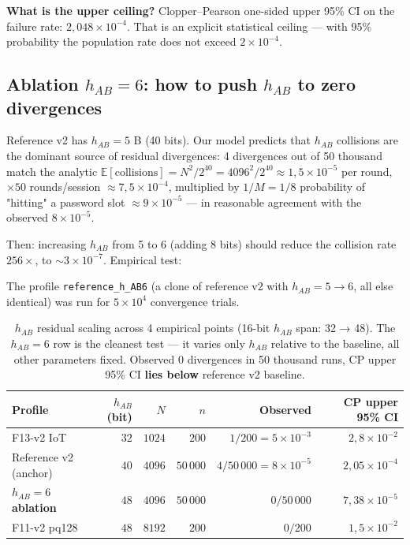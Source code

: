 \documentclass[11pt,a4paper]{article}
\begin{document}
\textbf{What is the upper ceiling?} Clopper--Pearson one-sided upper 95\% CI on the failure rate: $2{,}048 \times 10^{-4}$. That is an explicit statistical ceiling --- with 95\% probability the population rate does not exceed $2 \times 10^{-4}$.

\subsection{Ablation $h_{AB} = 6$: how to push $h_{AB}$ to zero divergences}\label{pop:exp-habresidual}

Reference v2 has $h_{AB} = 5$ B (40 bits). Our model predicts that $h_{AB}$ collisions are the dominant source of residual divergences: 4 divergences out of 50 thousand match the analytic $\mathbb{E}[\text{collisions}] = N^2 / 2^{40} = 4096^2 / 2^{40} \approx 1{,}5 \times 10^{-5}$ per round, $\times 50$ rounds/session $\approx 7{,}5 \times 10^{-4}$, multiplied by $1/M=1/8$ probability of "hitting" a password slot $\approx 9 \times 10^{-5}$ --- in reasonable agreement with the observed $8 \times 10^{-5}$.

Then: increasing $h_{AB}$ from 5 to 6 (adding 8 bits) should reduce the collision rate $256\times$, to $\sim 3 \times 10^{-7}$. Empirical test:

The profile \texttt{reference\_h\_AB6} (a clone of reference v2 with $h_{AB} = 5 \to 6$, all else identical) was run for $5 \times 10^4$ convergence trials.

\begin{table}[ht]
\centering
\small
\begin{tabular}{lrrrrr}
\toprule
\textbf{Profile} & \textbf{$h_{AB}$ (bit)} & \textbf{$N$} & \textbf{$n$} & \textbf{Observed} & \textbf{CP upper 95\% CI} \\
\midrule
F13-v2 IoT             & $32$ & $1024$ & $200$ & $1/200 = 5 \times 10^{-3}$ & $2{,}8 \times 10^{-2}$ \\
Reference v2 (anchor) & $40$ & $4096$ & $50\,000$ & $4/50\,000 = 8 \times 10^{-5}$ & $2{,}05 \times 10^{-4}$ \\
\textbf{$h_{AB}=6$ ablation} & \textbf{$48$} & \textbf{$4096$} & \textbf{$50\,000$} & \textbf{$0/50\,000$} & \textbf{$7{,}38 \times 10^{-5}$} \\
F11-v2 pq128 & $48$ & $8192$ & $200$ & $0/200$ & $1{,}5 \times 10^{-2}$ \\
\bottomrule
\end{tabular}
\caption{$h_{AB}$ residual scaling across 4 empirical points (16-bit $h_{AB}$ span: 32 → 48). The $h_{AB}=6$ row is the cleanest test --- it varies only $h_{AB}$ relative to the baseline, all other parameters fixed. Observed 0 divergences in 50 thousand runs, CP upper 95\% CI \textbf{lies below} reference v2 baseline.}
\label{tab:pop-hab-scaling}
\end{table}
\end{document}
